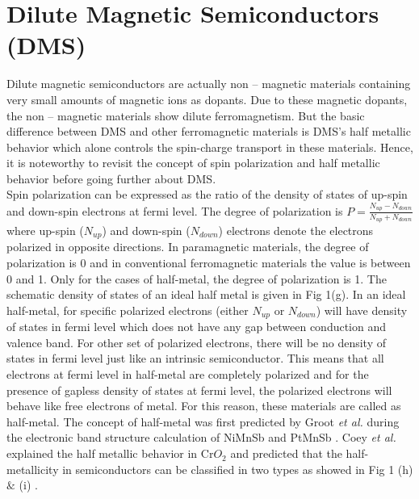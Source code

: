 \documentclass[main.tex]{subfiles}
\begin{document}
\section{Dilute Magnetic Semiconductors (DMS)}

Dilute magnetic semiconductors are actually non – magnetic materials containing very small amounts of magnetic ions as dopants. Due to these magnetic dopants, the non – magnetic materials show dilute ferromagnetism. But the basic difference between DMS and other ferromagnetic materials is DMS’s half metallic behavior which alone controls the spin-charge transport in these materials. Hence, it is noteworthy to revisit the concept of spin polarization and half metallic behavior before going further about DMS. \\

Spin polarization can be expressed as the ratio of the density of states of up-spin and down-spin electrons at fermi level. The degree of polarization is \( P=\frac{N_{up}-N_{down}}{N_{up}+N_{down}} \) where up-spin ($N_{up}$) and down-spin ($N_{down}$) electrons denote the electrons polarized in opposite directions. In paramagnetic materials, the degree of polarization is 0 and in conventional ferromagnetic materials the value is between 0 and 1. Only for the cases of half-metal, the degree of polarization is 1. The schematic density of states of an ideal half metal is given in Fig 1(g). In an ideal half-metal, for specific polarized electrons (either $N_{up}$ or $N_{down}$) will have density of states in fermi level which does not have any gap between conduction and valence band. For other set of polarized electrons, there will be no density of states in fermi level just like an intrinsic semiconductor. This means that all electrons at fermi level in half-metal are completely polarized and for the presence of gapless density of states at fermi level, the polarized electrons will behave like free electrons of metal. For this reason, these materials are called as half-metal. The concept of half-metal was first predicted by Groot \textit{et al.} during the electronic band structure calculation of NiMnSb and PtMnSb \cite{groot1983}. Coey \textit{et al.} explained the half metallic behavior in Cr$O_2$ and predicted that the half-metallicity in semiconductors can be classified in two types as showed in Fig 1 (h) $\&$ (i) \cite{coey2002half}. 
\end{document}
